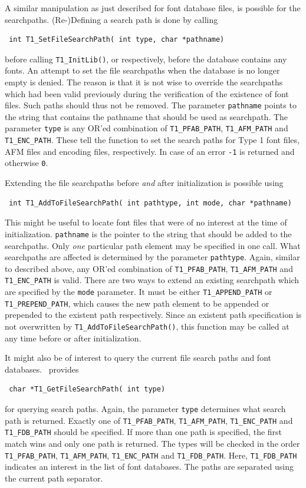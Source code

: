 A similar manipulation as just described for font database files, is
possible for the searchpaths. (Re-)Defining a search 
path is done by calling 
\precorr
\begin{verbatim}
 int T1_SetFileSearchPath( int type, char *pathname)
\end{verbatim}\postcorr
before calling \verb+T1_InitLib()+, or respectively, before the database
contains any fonts. An attempt to set the file searchpaths when the database
is no longer empty is denied. The reason is that it is not wise to override
the searchpaths which had been valid previously during the verification of the
existence of font files. Such paths should thus not be removed.  The parameter
\verb+pathname+ points to the string that contains the pathname that should be
used as searchpath. The parameter \verb+type+ is any OR'ed combination of
\verb+T1_PFAB_PATH+, \verb+T1_AFM_PATH+ and \verb+T1_ENC_PATH+. These tell the
function to set the search paths for Type 1 font files, AFM files and encoding
files, respectively. In case of an error \verb+-1+ is returned and otherwise
\verb+0+.

Extending the file searchpaths before {\em and} after initialization
is possible using 
\precorr
\begin{verbatim}
 int T1_AddToFileSearchPath( int pathtype, int mode, char *pathname)
\end{verbatim}\postcorr
This might be useful to locate font files that were of no interest
at the time of initialization. 
\verb+pathname+ is the pointer to the string that should be added to the
searchpaths. Only {\em one} particular path element may be specified in one
call. What searchpaths are affected is determined by the parameter
\verb+pathtype+. Again, similar to described above, any
OR'ed combination of \verb+T1_PFAB_PATH+, \verb+T1_AFM_PATH+ and
\verb+T1_ENC_PATH+ is valid. There are two ways to extend an existing
searchpath which are specified by the \verb+mode+ parameter. It must be either
\verb+T1_APPEND_PATH+ or \verb+T1_PREPEND_PATH+, which causes the new path
element to be appended or prepended to the existent path respectively.
Since an existent path specification is not overwritten by
\verb+T1_AddToFileSearchPath()+, this function may be called at any time
before or after initialization.

It might also be of interest to query the current file search
paths and font databases. \tonelib\ provides 
\precorr
\begin{verbatim}
 char *T1_GetFileSearchPath( int type)
\end{verbatim}\postcorr 
for querying search paths. Again, the parameter \verb+type+ determines what
search path is returned. Exactly one of \verb+T1_PFAB_PATH+,
\verb+T1_AFM_PATH+, \verb+T1_ENC_PATH+ and \verb+T1_FDB_PATH+ should be
specified. If more than one path is specified, the first match wins and only
one path is returned. The types will be checked in the order
\verb+T1_PFAB_PATH+, \verb+T1_AFM_PATH+, \verb+T1_ENC_PATH+ and
\verb+T1_FDB_PATH+. Here, \verb+T1_FDB_PATH+ indicates an interest in the list
of font databases. The paths are separated using the current path separator. 


